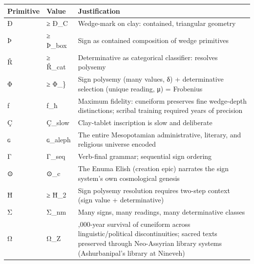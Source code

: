 \documentclass[
  11pt,
  a4paper,
]{article}
\newcounter{none} %
\begin{document}
{\def\LTcaptype{none} %
\begin{longtable}[]{@{}
  >{\raggedright\arraybackslash}p{}
  >{\raggedright\arraybackslash}p{}
  >{\raggedright\arraybackslash}p{}@{}}
\toprule\noalign{}
\begin{minipage}[b]{\linewidth}\raggedright
Primitive
\end{minipage} & \begin{minipage}[b]{\linewidth}\raggedright
Value
\end{minipage} & \begin{minipage}[b]{\linewidth}\raggedright
Justification
\end{minipage} \\
\midrule\noalign{}
\endhead
\bottomrule\noalign{}
\endlastfoot
Ð & ≥ Ð\_C & Wedge-mark on clay: contained, triangular geometry \\
Þ & ≥ Þ\_box & Sign as contained composition of wedge primitives \\
Ř & ≥ Ř\_cat & Determinative as categorical classifier: resolves
polysemy \\
Φ & ≥ Φ\_\} & Sign polysemy (many values, δ) + determinative selection
(unique reading, μ) = Frobenius \\
ƒ & ƒ\_ħ & Maximum fidelity: cuneiform preserves fine wedge-depth
distinctions; scribal training required years of precision \\
Ç & Ç\_slow & Clay-tablet inscription is slow and deliberate \\
ɢ & ɢ\_aleph & The entire Mesopotamian administrative, literary, and
religious universe encoded \\
Γ & Γ\_seq & Verb-final grammar; sequential sign ordering \\
⊙ & ⊙\_c & The Enuma Elish (creation epic) narrates the sign system's
own cosmological genesis \\
Ħ & ≥ Ħ\_2 & Sign polysemy resolution requires two-step context (sign
value + determinative) \\
Σ & Σ\_nm & Many signs, many readings, many determinative classes \\
Ω & Ω\_Z & 3,000-year survival of cuneiform across linguistic/political
discontinuities; sacred texts preserved through Neo-Assyrian library
systems (Ashurbanipal's library at Nineveh) \\
\end{longtable}
}
\end{document}
